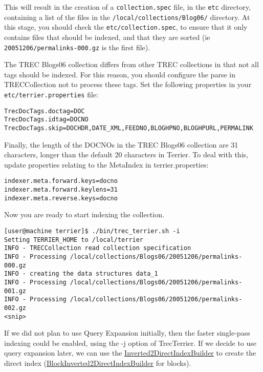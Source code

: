 This will result in the creation of a \texttt{collection.spec} file, in
the \texttt{etc} directory, containing a list of the files in the
\texttt{/local/collections/Blog06/} directory. At this stage, you should
check the \texttt{etc/collection.spec}, to ensure that it only contains
files that should be indexed, and that they are sorted (ie
\texttt{20051206/permalinks-000.gz} is the first file).

The TREC Blogs06 collection differs from other TREC collections in that
not all tags should be indexed. For this reason, you should configure
the parse in TRECCollection not to process these tags. Set the following
properties in your \texttt{etc/terrier.properties} file:

\begin{verbatim}
TrecDocTags.doctag=DOC
TrecDocTags.idtag=DOCNO
TrecDocTags.skip=DOCHDR,DATE_XML,FEEDNO,BLOGHPNO,BLOGHPURL,PERMALINK
\end{verbatim}

Finally, the length of the DOCNOs in the TREC Blogs06 collection are 31
characters, longer than the default 20 characters in Terrier. To deal
with this, update properties relating to the MetaIndex in
terrier.properties:

\begin{verbatim}
indexer.meta.forward.keys=docno
indexer.meta.forward.keylens=31
indexer.meta.reverse.keys=docno
\end{verbatim}

Now you are ready to start indexing the collection.

\begin{verbatim}
[user@machine terrier]$ ./bin/trec_terrier.sh -i
Setting TERRIER_HOME to /local/terrier
INFO - TRECCollection read collection specification
INFO - Processing /local/collections/Blogs06/20051206/permalinks-000.gz
INFO - creating the data structures data_1
INFO - Processing /local/collections/Blogs06/20051206/permalinks-001.gz
INFO - Processing /local/collections/Blogs06/20051206/permalinks-002.gz
<snip>
\end{verbatim}

If we did not plan to use Query Expansion initially, then the faster
single-pass indexing could be enabled, using the -j option of
TrecTerrier. If we decide to use query expansion later, we can use the
\href{javadoc/org/terrier/structures/indexing/singlepass/Inverted2DirectIndexBuilder.html}{Inverted2DirectIndexBuilder}
to create the direct index
(\href{javadoc/org/terrier/structures/indexing/singlepass/BlockInverted2DirectIndexBuilder.html}{BlockInverted2DirectIndexBuilder}
for blocks).

